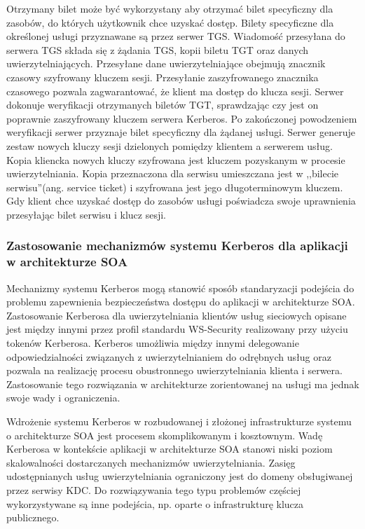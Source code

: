 			Otrzymany bilet może być wykorzystany aby otrzymać bilet specyficzny dla zasobów, do których użytkownik chce uzyskać dostęp. Bilety specyficzne dla określonej usługi przyznawane są przez serwer TGS. Wiadomość przesyłana do serwera TGS składa się z żądania TGS, kopii biletu TGT oraz danych uwierzytelniających. Przesyłane dane uwierzytelniające obejmują znacznik czasowy szyfrowany kluczem sesji. Przesyłanie zaszyfrowanego znacznika czasowego pozwala zagwarantować, że klient ma dostęp do klucza sesji. Serwer dokonuje weryfikacji otrzymanych biletów TGT, sprawdzając czy jest on poprawnie zaszyfrowany kluczem serwera Kerberos. Po zakończonej powodzeniem weryfikacji serwer przyznaje bilet specyficzny dla żądanej usługi. Serwer generuje zestaw nowych kluczy sesji dzielonych pomiędzy klientem a serwerem usług. Kopia kliencka nowych kluczy szyfrowana jest kluczem pozyskanym w procesie uwierzytelniania. Kopia przeznaczona dla serwisu umieszczana jest w ,,bilecie serwisu''(ang. service ticket) i  szyfrowana jest jego długoterminowym kluczem. Gdy klient chce uzyskać dostęp do zasobów usługi poświadcza swoje uprawnienia przesyłając bilet serwisu i klucz sesji.

		\subsubsection{Zastosowanie mechanizmów systemu Kerberos dla aplikacji w architekturze SOA}

			Mechanizmy systemu Kerberos mogą stanowić sposób standaryzacji podejścia do problemu zapewnienia bezpieczeństwa dostępu do aplikacji w 	architekturze SOA. Zastosowanie Kerberosa dla uwierzytelniania klientów usług sieciowych opisane jest między innymi przez profil standardu WS-Security realizowany przy użyciu tokenów Kerberosa. Kerberos umożliwia między innymi delegowanie odpowiedzialności związanych z uwierzytelnianiem do odrębnych usług oraz pozwala na realizację procesu obustronnego uwierzytelniania klienta i serwera. Zastosowanie tego rozwiązania w architekturze zorientowanej na usługi ma jednak swoje wady i ograniczenia. 

			Wdrożenie systemu Kerberos w rozbudowanej i złożonej infrastrukturze systemu o architekturze SOA jest procesem skomplikowanym i kosztownym. Wadę Kerberosa w kontekście aplikacji w architekturze SOA stanowi niski poziom skalowalności dostarczanych mechanizmów uwierzytelniania. Zasięg udostępnianych usług uwierzytelniania ograniczony jest do domeny obsługiwanej przez serwisy KDC. Do rozwiązywania tego typu problemów częściej wykorzystywane są inne podejścia, np. oparte o infrastrukturę klucza publicznego.
	

